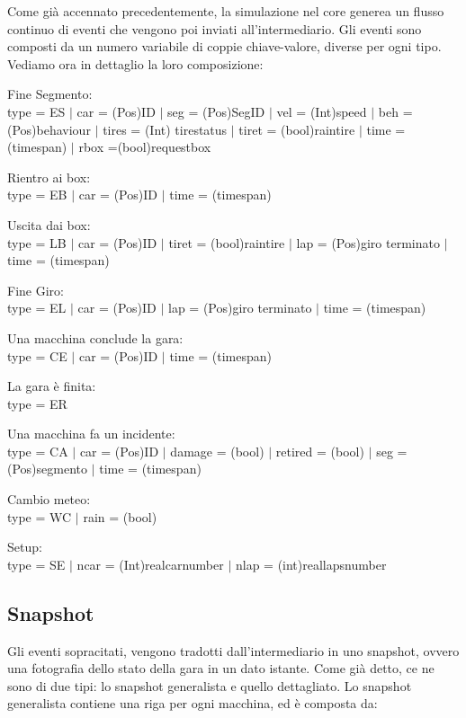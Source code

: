 Come già accennato precedentemente, la simulazione nel core generea un flusso continuo di eventi che vengono poi inviati all’intermediario. Gli eventi sono composti da un numero variabile di coppie chiave-valore, diverse per ogni tipo. Vediamo ora in dettaglio la loro composizione:

Fine Segmento: \\
   type = ES $|$ car = (Pos)ID $|$ seg = (Pos)Seg\textunderscore ID $|$ vel = (Int)speed $|$ beh = (Pos)behaviour $|$
   tire\textunderscore s = (Int) tire\textunderscore status $|$ tire\textunderscore t = (bool)rain\textunderscore tire $|$ time = (time\textunderscore span) $|$ r\textunderscore box =(bool)request\textunderscore box

Rientro ai box: \\
   type = EB $|$ car = (Pos)ID $|$ time = (time\textunderscore span)

Uscita dai box: \\
  type = LB $|$ car = (Pos)ID $|$ tire\textunderscore t = (bool)rain\textunderscore tire $|$ lap = (Pos)giro terminato $|$ time = (time\textunderscore span)

Fine Giro: \\
  type = EL $|$ car = (Pos)ID $|$ lap = (Pos)giro terminato $|$ time = (time\textunderscore span)

Una macchina conclude la gara: \\
  type = CE $|$ car = (Pos)ID $|$ time = (time\textunderscore span)

La gara è finita: \\
  type = ER

Una macchina fa un incidente: \\
  type = CA $|$ car = (Pos)ID $|$ damage = (bool) $|$ retired = (bool) $|$ seg = (Pos)segmento $|$
  time = (time\textunderscore span)

Cambio meteo: \\
   type = WC $|$ rain = (bool)

Setup: \\
  type = SE $|$ ncar = (Int)real\textunderscore car\textunderscore number $|$ nlap = (int)real\textunderscore laps\textunderscore number
  
\subsection{Snapshot}

Gli eventi sopracitati, vengono tradotti dall’intermediario in uno snapshot, ovvero una fotografia dello stato della gara in un dato istante. Come già detto, ce ne sono di due tipi: lo snapshot generalista e quello dettagliato.
Lo snapshot generalista contiene una riga per ogni macchina, ed è composta da:

